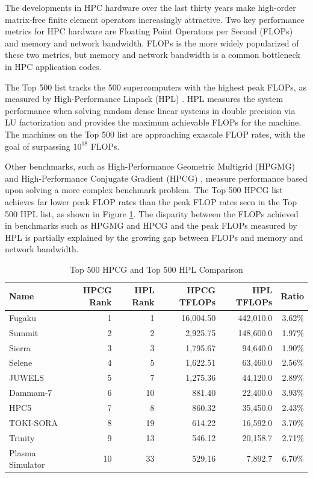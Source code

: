 The developments in HPC hardware over the last thirty years make high-order matrix-free finite element operators increasingly attractive.
Two key performance metrics for HPC hardware are Floating Point Operatons per Second (FLOPs) and memory and network bandwidth.
FLOPs is the more widely popularized of these two metrics, but memory and network bandwidth is a common bottleneck in HPC application codes. 

The Top 500 \cite{meuertop500} list tracks the 500 supercomputers with the highest peak FLOPs, as measured by High-Performance Linpack (HPL) \cite{petitethpl}.
HPL measures the system performance when solving random dense linear systems in double precision via LU factorization and provides the maximum achievable FLOPs for the machine.
The machines on the Top 500 list are approaching exascale FLOP rates, with the goal of surpassing $10^{18}$ FLOPs.

Other benchmarks, such as High-Performance Geometric Multigrid (HPGMG) \cite{adams2014hpgmg} and High-Performance Conjugate Gradient (HPCG) \cite{dongarra2016high}, measure performance based upon solving a more complex benchmark problem.
The Top 500 \cite{meuertop500} HPCG list achieves far lower peak FLOP rates than the peak FLOP rates seen in the Top 500 HPL list, as shown in Figure \ref{table:top500}.
The disparity between the FLOPs achieved in benchmarks such as HPGMG and HPCG and the peak FLOPs measured by HPL is partially explained by the growing gap between FLOPs and memory and network bandwidth.

\begin{table}[ht!]
\begin{center}
\begin{tabular}{l r r r r r}
  \toprule
  Name & HPCG Rank & HPL Rank & HPCG TFLOPs & HPL TFLOPs & Ratio \\
  \midrule
  Fugaku           &  1 &  1 & 16,004.50 & 442,010.0 & 3.62\% \\
  Summit           &  2 &  2 &  2,925.75 & 148,600.0 & 1.97\% \\
  Sierra           &  3 &  3 &  1,795.67 &  94,640.0 & 1.90\% \\
  Selene           &  4 &  5 &  1,622.51 &  63,460.0 & 2.56\% \\
  JUWELS           &  5 &  7 &  1,275.36 &  44,120.0 & 2.89\% \\
  Dammam-7         &  6 & 10 &    881.40 &  22,400.0 & 3.93\% \\
  HPC5             &  7 &  8 &    860.32 &  35,450.0 & 2.43\% \\
  TOKI-SORA        &  8 & 19 &    614.22 &  16,592.0 & 3.70\% \\
  Trinity          &  9 & 13 &    546.12 &  20,158.7 & 2.71\% \\
  Plasma Simulator & 10 & 33 &    529.16 &   7,892.7 & 6.70\% \\
  \bottomrule
\end{tabular}
\end{center}
\caption{Top 500 HPCG and Top 500 HPL Comparison}
\label{table:top500}
\end{table}

